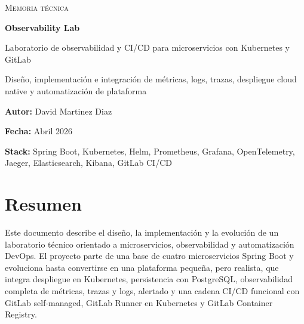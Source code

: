 \documentclass[
a4paper,
12pt]{report}
\begin{document}
\begin{titlepage}
  \thispagestyle{empty}
  \vspace*{2.2cm}

  {\large\scshape Memoria técnica\par}
  \vspace{1.6cm}

  {\Huge\bfseries Observability Lab\par}
  \vspace{0.8cm}

  {\Large Laboratorio de observabilidad y CI/CD para microservicios con
Kubernetes y GitLab\par}
  \vspace{1.4cm}

  {\large Diseño, implementación e integración de métricas, logs, trazas, despliegue cloud native y automatización de plataforma\par}
  \vspace{2.0cm}

  {\large\textbf{Autor:} David Martinez Diaz\par}
  \vspace{0.25cm}
  {\large\textbf{Fecha:} Abril 2026\par}
  \vspace{0.25cm}
  {\large\textbf{Stack:} Spring Boot, Kubernetes, Helm, Prometheus, Grafana, OpenTelemetry, Jaeger, Elasticsearch, Kibana, GitLab CI/CD\par}

  \vfill
\end{titlepage}

\setcounter{page}{1}

{
  \hypersetup{linkcolor=black}
  \tableofcontents
}
\clearpage

\chapter{Resumen}\label{resumen}

Este documento describe el diseño, la implementación y la evolución de
un laboratorio técnico orientado a microservicios, observabilidad y
automatización DevOps. El proyecto parte de una base de cuatro
microservicios Spring Boot y evoluciona hasta convertirse en una
plataforma pequeña, pero realista, que integra despliegue en Kubernetes,
persistencia con PostgreSQL, observabilidad completa de métricas, trazas
y logs, alertado y una cadena CI/CD funcional con GitLab self-managed,
GitLab Runner en Kubernetes y GitLab Container Registry.
\end{document}
